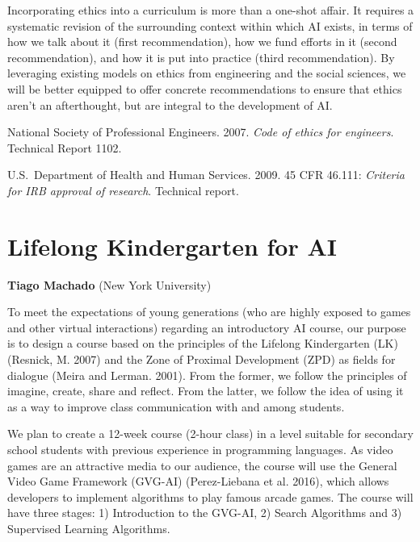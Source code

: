 \documentclass[letterpaper]{article}
\begin{document}
Incorporating ethics into a curriculum is more than a one-shot affair. It requires a systematic revision of the surrounding context within which AI exists, in terms of how we talk about it (first recommendation), how we fund efforts in it (second recommendation), and how it is put into practice (third recommendation). By leveraging existing models on ethics from engineering and the social sciences, we will be better equipped to offer concrete recommendations to ensure that ethics aren't an afterthought, but are integral to the development of AI.\\[-0.75em]

{\footnotesize
{}

\noindent National Society of Professional Engineers. 2007. {\em Code of ethics for engineers}. Technical Report 1102.\vspace{0.25em}

\noindent U.S.~Department of Health and Human Services. 2009. 45 CFR 46.111: {\em Criteria for IRB approval of research}. Technical report.\vspace{0.25em}
}




\section{Lifelong Kindergarten for AI}
\begin{center}
{\bf Tiago Machado} (New York University)
\end{center}


To meet the expectations of young generations (who are highly exposed
to games and other virtual interactions) 
regarding an introductory AI course, our purpose
is to design a course based on the principles of the Lifelong Kindergarten (LK) (Resnick, M. 2007) and the Zone of Proximal Development (ZPD) as fields for dialogue (Meira and Lerman. 2001). From the former, we follow the principles of imagine, create, share and reflect. From the latter, we follow the idea of using it as a way to improve class communication with and among students.

We plan to create a 12-week course (2-hour class) in a
level suitable for secondary school students with previous
experience in programming languages. As video games
are an attractive media to our audience, the course
will use the General Video Game Framework (GVG-AI) (Perez-Liebana et al. 2016), which allows developers to implement
algorithms to play famous arcade games. The
course will have three stages: 1) Introduction to the
GVG-AI, 2) Search Algorithms and 3) Supervised
Learning Algorithms.
\end{document}

